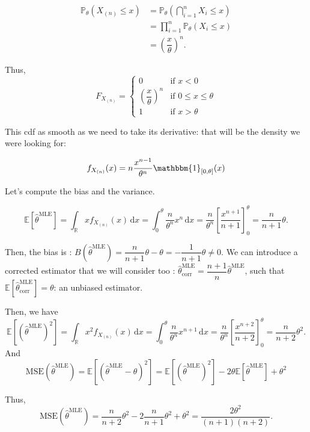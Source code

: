 \begin{itemize}
\begin{align*}
    \mathbb{P}_\theta(X_{(n)} \le x) &= \mathbb{P}_\theta\left(\bigcap_{i=1}^{n} {X_i \le x}\right)\\
    &= \prod_{i=1}^{n} \mathbb{P}_\theta(X_i \le x)\\
    &= \left(\dfrac{x}{\theta}\right)^n.
\end{align*}

Thus, $$F_{X_{(n)}} = \begin{cases}
        0 & \text{if } x < 0\\
        \left(\dfrac{x}{\theta}\right)^n & \text{if } 0 \le x \le \theta\\
        1 & \text{if } x>\theta
        \end{cases}$$

This cdf as smooth as we need to take its derivative: that will be the density we were looking for:

$$f_{X_{(n)}}(x) = n \dfrac{x^{n-1}}{\theta^n} \mathbbm{1}_{[0, \theta]}(x)$$

Let's compute the bias and the variance.\newline

$$\mathbb{E}[\hat{\theta}^{\text{MLE}}] = \displaystyle \int_{\mathbb{R}} x f_{X_{(n)}}(x) \, \mathrm{d}x = \displaystyle \int_{0}^{\theta} \dfrac{n}{\theta^n} x^n \, \mathrm{d}x = \dfrac{n}{\theta^n} \left[ \dfrac{x^{n+1}}{n+1}\right]^\theta_0 = \dfrac{n}{n+1}\theta.$$

Then, the bias is : $B(\hat{\theta}^{\text{MLE}}) = \dfrac{n}{n+1}\theta - \theta = -\dfrac{1}{n+1}\theta \ne 0.$ We can introduce a corrected estimator that we will consider too : $\hat{\theta}_{\text{corr}}^{\text{MLE}} = \dfrac{n+1}{n} \hat{\theta}^{\text{MLE}}$, such that $\mathbb{E}[\hat{\theta}_{\text{corr}}^{\text{MLE}}] = \theta$:  an unbiased estimator.\newline

Then, we have $$\mathbb{E}[(\hat{\theta}^{\text{MLE}})^2] = \displaystyle \int_{\mathbb{R}} x^2 f_{X_{(n)}}(x) \, \mathrm{d}x = \displaystyle \int_{0}^{\theta} \dfrac{n}{\theta^n} x^{n+1} \, \mathrm{d}x = \dfrac{n}{\theta^n} \left[ \dfrac{x^{n+2}}{n+2}\right]^\theta_0 = \dfrac{n}{n+2}\theta^2.$$ And $$\text{MSE}(\hat{\theta}^{\text{MLE}}) = \mathbb{E}[(\hat{\theta}^{\text{MLE}} - \theta)^2] = \mathbb{E}[(\hat{\theta}^{\text{MLE}})^2] -2 \theta \mathbb{E}[\hat{\theta}^{\text{MLE}}] + \theta^2$$

Thus, $$\text{MSE}(\hat{\theta}^{\text{MLE}}) = \dfrac{n}{n+2}\theta^2 - 2\dfrac{n}{n+1}\theta^2 + \theta^2 = \dfrac{2\theta^2}{(n+1)(n+2)}.$$


\end{itemize}
